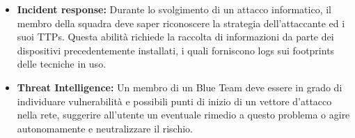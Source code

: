 \begin{itemize}
\begin{enumerate}
        \end{enumerate}
        \item \textbf{Incident response:} Durante lo svolgimento di un attacco informatico, il membro della squadra deve saper riconoscere la strategia dell'attaccante ed i suoi TTPs. Questa abilità richiede la raccolta di informazioni da parte dei dispositivi precedentemente installati, i quali forniscono logs sui footprints delle tecniche in uso.
        \item \textbf{Threat Intelligence:} Un membro di un Blue Team deve essere in grado di individuare vulnerabilità e possibili punti di inizio di un vettore d'attacco nella rete, suggerire all'utente un eventuale rimedio a questo problema o agire autonomamente e neutralizzare il rischio.
    \end{itemize}

